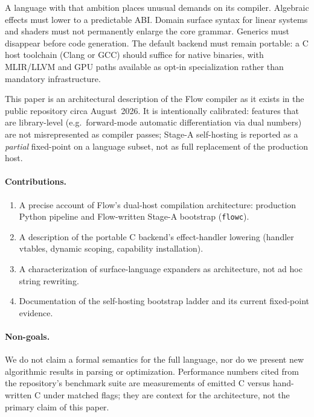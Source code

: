 \documentclass[11pt,a4paper]{article}
\theoremstyle{remark}
\begin{document}
A language with that ambition places unusual demands on its compiler.
Algebraic effects must lower to a predictable ABI. Domain surface syntax for
linear systems and shaders must not permanently enlarge the core grammar.
Generics must disappear before code generation. The default backend must remain
portable: a C host toolchain (Clang or GCC) should suffice for native binaries,
with MLIR/LLVM and GPU paths available as opt-in specialization rather than
mandatory infrastructure.

This paper is an architectural description of the Flow compiler as it exists in
the public repository circa August~2026. It is intentionally calibrated:
features that are library-level (e.g.\ forward-mode automatic differentiation via
dual numbers) are not misrepresented as compiler passes; Stage-A self-hosting
is reported as a \emph{partial} fixed-point on a language subset, not as full
replacement of the production host.

\paragraph{Contributions.}
\begin{enumerate}[leftmargin=*,itemsep=0.25em]
  \item A precise account of Flow's dual-host compilation architecture:
        production Python pipeline and Flow-written Stage-A bootstrap
        (\texttt{flowc}).
  \item A description of the portable C backend's effect-handler lowering
        (handler vtables, dynamic scoping, capability installation).
  \item A characterization of surface-language expanders as architecture,
        not ad hoc string rewriting.
  \item Documentation of the self-hosting bootstrap ladder and its current
        fixed-point evidence.
\end{enumerate}

\paragraph{Non-goals.}
We do not claim a formal semantics for the full language, nor do we present
new algorithmic results in parsing or optimization. Performance numbers cited
from the repository's benchmark suite are measurements of emitted C versus
hand-written C under matched flags; they are context for the architecture,
not the primary claim of this paper.
\end{document}

